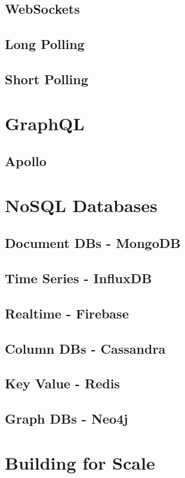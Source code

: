 \documentclass[a4paper]{article}
\begin{document}
    \subsection{WebSockets}
    \subsection{Long Polling}
    \subsection{Short Polling}

    \newpage
    \section{GraphQL}
    \subsection{Apollo}

    \newpage
    \section{NoSQL Databases}
    \subsection{Document DBs - MongoDB}
    \subsection{Time Series - InfluxDB}
    \subsection{Realtime - Firebase}
    \subsection{Column DBs - Cassandra}
    \subsection{Key Value - Redis}
    \subsection{Graph DBs - Neo4j}

    \newpage
    \section{Building for Scale}
\end{document}
